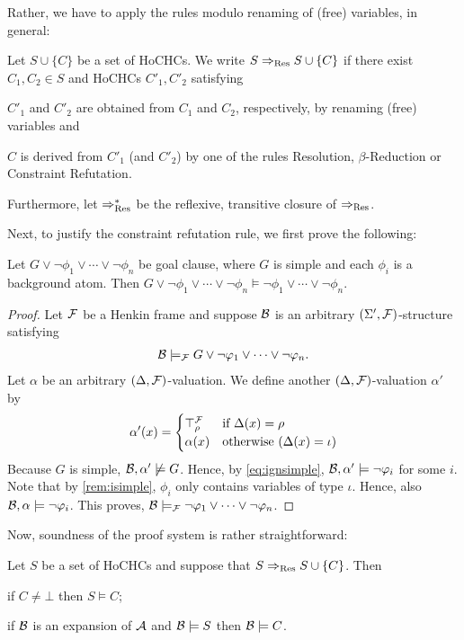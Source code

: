 \documentclass[a4paper,twoside,notitlepage,openright,11pt]{report}
\begin{document}
Rather, we have to apply the rules modulo renaming of (free) variables, in general:
\begin{definition}
  Let $S\cup\{C\}$ be a set of HoCHCs. We write $S\Rightarrow_{\operatorname{Res}} S\cup\{C\}$ if there exist $C_1,C_2\in S$ and HoCHCs $C'_1,C'_2$  satisfying
  \begin{thmlist}
  \item $C'_1$ and $C'_2$ are obtained from $C_1$ and $C_2$, respectively, by renaming (free) variables and
  \item $C$ is derived from $C'_1$ (and $C'_2$) by one of the rules Resolution, $\beta$-Reduction or Constraint Refutation.
  \end{thmlist}
  Furthermore, let $\Rightarrow_{\operatorname{Res}}^*$ be the reflexive, transitive closure of $\Rightarrow_{\operatorname{Res}}$.
\end{definition}
Next, to justify the constraint refutation rule, we first prove the following:
\begin{lemma}
  \label{lem:ignoresimple}
  Let $G\lor\neg\phi_1\lor\cdots\lor\neg\phi_n$ be goal clause, where $G$ is simple and each $\phi_i$ is a background atom.
  Then $G\lor\neg\phi_1\lor\cdots\lor\neg\phi_n\models\neg\phi_1\lor\cdots\lor\neg\phi_n$.
\end{lemma}
\begin{proof}
  Let $\mathcal F$ be a Henkin frame and suppose $\mathcal B$ is an arbitrary $(\Sigma',\mathcal F)$-structure satisfying
  \begin{align}
    \label{eq:ignsimple}
    \mathcal B\models_\mathcal F G\lor\neg\varphi_1\lor\cdots\lor\neg\varphi_n.
  \end{align}
  Let $\alpha$ be an arbitrary $(\Delta,\mathcal F)$-valuation. We define another $(\Delta,\mathcal F)$-valuation $\alpha'$ by
  \begin{align*}
    \alpha'(x)=
    \begin{cases}
      \top_\rho^\mathcal F&\text{if }\Delta(x)=\rho\\
      \alpha(x)&\text{otherwise ($\Delta(x)=\iota$)}
    \end{cases}
  \end{align*}
  Because $G$ is simple, $\mathcal B,\alpha'\not\models G$. Hence, by \cref{eq:ignsimple}, $\mathcal B,\alpha'\models\neg\varphi_i$ for some $i$. Note that by \cref{rem:isimple}, $\phi_i$ only contains variables of type $\iota$. Hence, also $\mathcal B,\alpha\models\neg\varphi_i$. This proves, $\mathcal B\models_\mathcal F \neg\varphi_1\lor\cdots\lor\neg\varphi_n$.
\end{proof}
Now, soundness of the proof system is rather straightforward:
\begin{proposition}
  Let $S$ be a set of HoCHCs and suppose that $S\Rightarrow_{\operatorname{Res}} S\cup\{C\}$. Then
  \begin{thmlist}
  \item\label{it:sound1} if $C\neq\bot$ then $S\models C$;
  \item if $\mathcal B$ is an expansion of $\mathcal A$ and $\mathcal B\models S$ then $\mathcal B\models C$.
  \end{thmlist}
\end{proposition}
\end{document}
